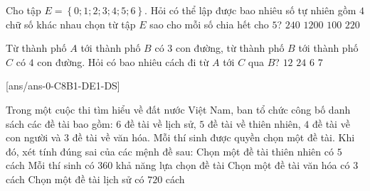 \begin{ex}%
	Cho tập $E=\left\{0;1;2;3;4;5;6\right\}$. Hỏi có thể lập được bao nhiêu số tự nhiên gồm $4$ chữ số khác nhau chọn từ tập $E$ sao cho mỗi số chia hết cho $5$?
	\choice
	{$240$}
	{$1200$}
	{$100$}
	{\True $220$}
\end{ex}

\begin{ex}%
	Từ thành phố $A$ tới thành phố $B$ có $3$ con đường, từ thành phố $B$ tới thành phố $C$ có $4$ con đường. Hỏi có bao nhiêu cách đi từ $A$ tới $C$ qua $B$?
	\choice
	{\True $12$}
	{$24$}
	{$6$}
	{$7$}
\end{ex}

[ans/ans-0-C8B1-DE1-DS]
\cauds
\begin{ex}%
	Trong một cuộc thi tìm hiểu về đất nước Việt Nam, ban tổ chức công bố danh sách các đề tài bao gồm: $6$ đề tài về lịch sử, $5$ đề tài về thiên nhiên, $4$ đề tài về con người và $3$ đề tài về văn hóa. Mỗi thí sinh được quyền chọn một đề tài. Khi đó, xét tính đúng sai của các mệnh đề sau:
	\choiceTF
	{\True Chọn một đề tài thiên nhiên có $5$ cách}
	{Mỗi thí sinh có $360$ khả năng lựa chọn đề tài}
	{\True Chọn một đề tài văn hóa có $3$ cách}
	{Chọn một đề tài lịch sử có $720$ cách}
\end{ex}

